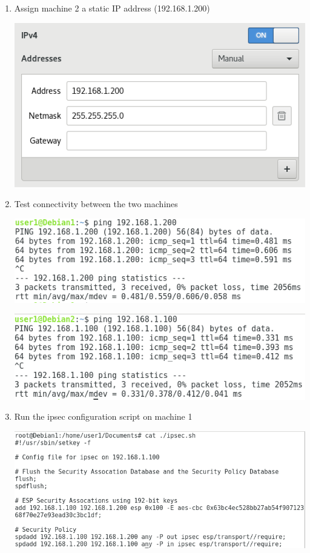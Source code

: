 \documentclass[12pt]{article}
\begin{document}
\begin{enumerate}
\item{Assign machine 2 a static IP address (192.168.1.200)

\includegraphics[scale=0.5]{res/machine2/static_ip}}

\newpage
\item{Test connectivity between the two machines

\includegraphics[scale=0.5]{res/machine1/test_connectivity}

\includegraphics[scale=0.5]{res/machine2/test_connectivity}}

\item{Run the ipsec configuration script on machine 1

\includegraphics[scale=0.5]{res/machine1/ipsec_config}

}
\end{enumerate}
\end{document}
